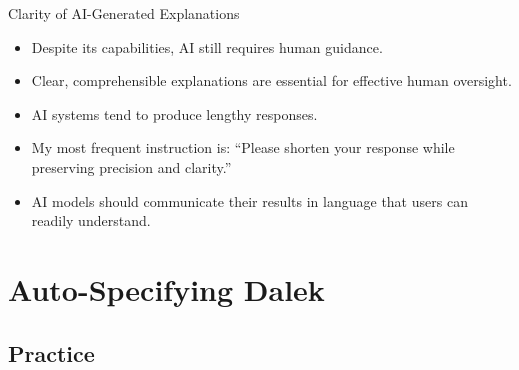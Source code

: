 \documentclass[aspectratio=169,xcolor=dvipsnames]{beamer}
\begin{document}
\begin{frame}{Clarity of AI-Generated Explanations}
    \begin{itemize}
        \item Despite its capabilities, AI still requires human guidance.
        \item Clear, comprehensible explanations are essential for effective human oversight.
        \item AI systems tend to produce lengthy responses.
        \item My most frequent instruction is: ``Please shorten your response while preserving precision and clarity.''
        \item AI models should communicate their results in language that users can readily understand.
    \end{itemize}
\end{frame}

\section{Auto-Specifying Dalek}
\subsection{Practice}
\end{document}
